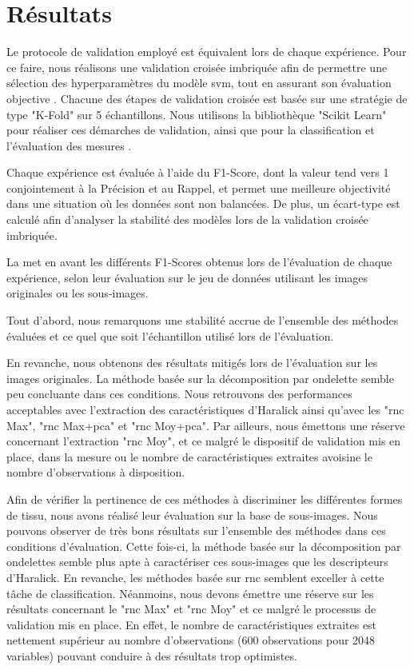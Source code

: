 \documentclass{gretsi}
\begin{document}
\begin{sloppypar}
\section{Résultats}
\label{resultat}
Le protocole de validation employé est équivalent lors de chaque expérience. Pour ce faire, nous réalisons une validation croisée imbriquée afin de permettre une sélection des hyperparamètres du modèle \ac{svm}, tout en assurant son évaluation objective \cite{Cawley2010}. Chacune des étapes de validation croisée est basée sur une stratégie de type "K-Fold" sur 5 échantillons. Nous utilisons la bibliothèque "Scikit Learn" pour réaliser ces démarches de validation, ainsi que pour la classification et l’évaluation des mesures \cite{pedregosa2011scikit}.\par
Chaque expérience est évaluée à l'aide du F1-Score, dont la valeur tend vers 1 conjointement à la Précision et au Rappel, et permet une meilleure objectivité dans une situation où les données sont non balancées. De plus, un écart-type est calculé afin d'analyser la stabilité des modèles lors de la validation croisée imbriquée.\par
La  met en avant les différents F1-Scores obtenus lors de l'évaluation de chaque expérience, selon leur évaluation sur le jeu de données utilisant les images originales ou les sous-images.\par
Tout d'abord, nous remarquons une stabilité accrue de l'ensemble des méthodes évaluées et ce quel que soit l'échantillon utilisé lors de l'évaluation.\par
En revanche, nous obtenons des résultats mitigés lors de l'évaluation sur les images originales. La méthode basée sur la décomposition par ondelette semble peu concluante dans ces conditions. Nous retrouvons des performances acceptables avec l'extraction des caractéristiques d'Haralick ainsi qu'avec les "\ac{rnc} Max", "\ac{rnc} Max\-+\ac{pca}" et "\ac{rnc} Moy+\ac{pca}". Par ailleurs, nous émettons une réserve concernant l'extraction "\ac{rnc} Moy", et ce malgré le dispositif de validation mis en place, dans la mesure ou le nombre de caractéristiques extraites avoisine le nombre d'observations à disposition.\par
Afin de vérifier la pertinence de ces méthodes à discriminer les différentes formes de tissu, nous avons réalisé leur évaluation sur la base de sous-images. Nous pouvons observer de très bons résultats sur l'ensemble des méthodes dans ces conditions d'évaluation. Cette fois-ci, la méthode basée sur la décomposition par ondelettes semble plus apte à caractériser ces sous-images que les descripteurs d'Haralick. En revanche, les méthodes basée sur \ac{rnc} semblent exceller à cette tâche de classification. Néanmoins, nous devons émettre une réserve sur les résultats concernant le "\ac{rnc} Max" et "\ac{rnc} Moy" et ce malgré le processus de validation mis en place. En effet, le nombre de caractéristiques extraites est nettement supérieur au nombre d'observations (600 observations pour 2048 variables) pouvant conduire à des résultats trop optimistes.\par


\end{sloppypar}
\end{document}
